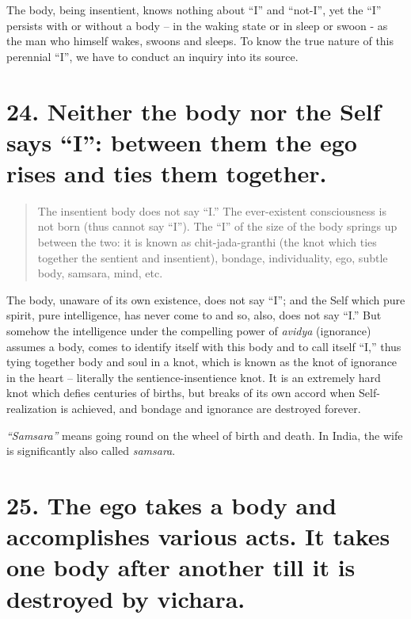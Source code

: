 \documentclass[12pt]{report}
\begin{document}
The body, being insentient, knows nothing about ``I'' and ``not-I'',
yet the ``I'' persists with or without a body -- in the waking state
or in sleep or swoon - as the man who himself wakes, swoons and
sleeps. To know the true nature of this perennial ``I'', we have to
conduct an inquiry into its source.


\section{24. Neither the body nor the Self says ``I'': between them the ego rises and ties them together.}

\begin{quote}
  The insentient body does not say ``I.'' The ever-existent
  consciousness is not born (thus cannot say ``I''). The ``I'' of the
  size of the body springs up between the two: it is known as
  chit-jada-granthi (the knot which ties together the sentient and
  insentient), bondage, individuality, ego, subtle body, samsara, mind,
  etc. 
\end{quote}

The body, unaware of its own existence, does not say ``I''; and the
Self which pure spirit, pure intelligence, has never come to and so,
also, does not say ``I.'' But somehow the intelligence under the
compelling power of \emph{avidya} (ignorance) assumes a body, comes to
identify itself with this body and to call itself ``I,'' thus tying
together body and soul in a knot, which is known as the knot of
ignorance in the heart -- literally the sentience-insentience knot. It
is an extremely hard knot which defies centuries of births, but breaks
of its own accord when Self-realization is achieved, and bondage and
ignorance are destroyed forever.

\emph{``Samsara''} means going round on the wheel of birth and
death. In India, the wife is significantly also called
\emph{samsara}. 


\section{25. The ego takes a body and accomplishes various acts. It takes one body after another till it is destroyed by vichara.}
\end{document}
